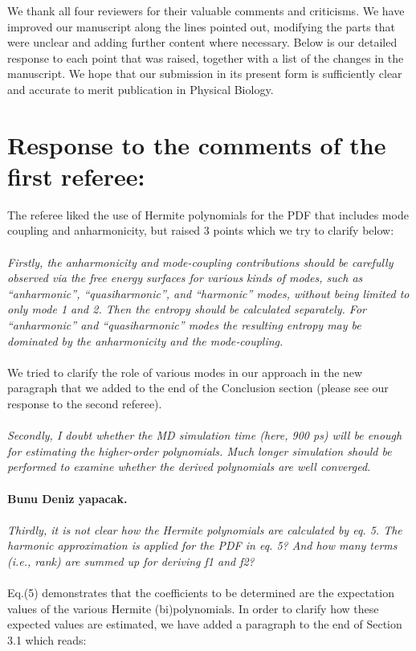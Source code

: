 \documentclass[12pt,article]{iopart}
\begin{document}
\noindent We thank all four reviewers for their valuable comments and
criticisms. We have improved our manuscript along the lines pointed
out, modifying the parts that were unclear and adding further content
where necessary. Below is our detailed response to each point that was
raised, together with a list of the changes in the manuscript. We hope
that our submission in its present form is sufficiently clear and
accurate to merit publication in Physical Biology.

\section{Response to the comments of the first referee:}

 
The referee liked the use of Hermite polynomials for the PDF that
includes mode coupling and anharmonicity, but raised 3 points which we
try to clarify below: \\ \\
{\it Firstly, the anharmonicity and mode-coupling
contributions should be carefully observed via the free energy
surfaces for various kinds of modes, such as
``anharmonic'', ``quasiharmonic'', and ``harmonic'' modes, without being
limited to only mode 1 and 2. Then the entropy should be calculated
separately. For ``anharmonic'' and ``quasiharmonic'' modes the resulting
entropy may be dominated by the anharmonicity and the mode‑coupling.}\\ \\
We tried to clarify the role of various modes in our approach in the
new paragraph that we added to the end of the Conclusion
section (please see our response to the second referee).\\ \\
{\it Secondly, I doubt whether the MD simulation time (here, 900 ps) will
be enough for estimating the higher-order polynomials. Much longer
simulation should be performed to examine whether the derived
polynomials are well converged.} \\ \\
{\bf Bunu Deniz yapacak.}\\ \\
{\it Thirdly, it is not clear how the Hermite polynomials are
  calculated by eq. 5. The harmonic approximation is applied for the
  PDF in eq. 5? And how many terms (i.e., rank) are summed up for
  deriving f1 and f2?}\\ \\
Eq.(5) demonstrates that the coefficients to be determined are the
expectation values of the various Hermite (bi)polynomials. In order to
clarify how these expected values are estimated, we have added a paragraph to
the end of Section 3.1 which reads:
\end{document}
